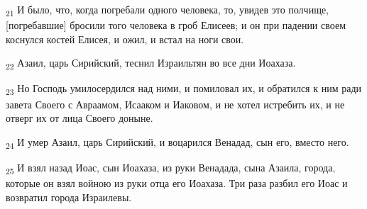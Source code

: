 \begin{tcolorbox}
\textsubscript{21} И было, что, когда погребали одного человека, то, увидев это полчище, [погребавшие] бросили того человека в гроб Елисеев; и он при падении своем коснулся костей Елисея, и ожил, и встал на ноги свои.
\end{tcolorbox}
\begin{tcolorbox}
\textsubscript{22} Азаил, царь Сирийский, теснил Израильтян во все дни Иоахаза.
\end{tcolorbox}
\begin{tcolorbox}
\textsubscript{23} Но Господь умилосердился над ними, и помиловал их, и обратился к ним ради завета Своего с Авраамом, Исааком и Иаковом, и не хотел истребить их, и не отверг их от лица Своего доныне.
\end{tcolorbox}
\begin{tcolorbox}
\textsubscript{24} И умер Азаил, царь Сирийский, и воцарился Венадад, сын его, вместо него.
\end{tcolorbox}
\begin{tcolorbox}
\textsubscript{25} И взял назад Иоас, сын Иоахаза, из руки Венадада, сына Азаила, города, которые он взял войною из руки отца его Иоахаза. Три раза разбил его Иоас и возвратил города Израилевы.
\end{tcolorbox}
